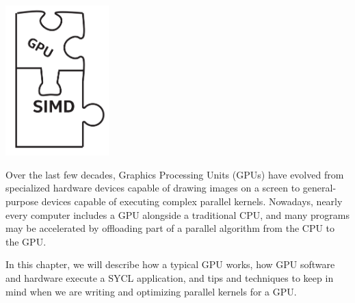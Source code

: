\begin{center}
	\includegraphics[width=0.3\textwidth]{content/chapter-15/images/1}
\end{center}

Over the last few decades, Graphics Processing Units (GPUs) have evolved from specialized hardware devices capable of drawing images on a screen to general-purpose devices capable of executing complex parallel kernels. Nowadays, nearly every computer includes a GPU alongside a traditional CPU, and many programs may be accelerated by offloading part of a parallel algorithm from the CPU to the GPU.\par

In this chapter, we will describe how a typical GPU works, how GPU software and hardware execute a SYCL application, and tips and techniques to keep in mind when we are writing and optimizing parallel kernels for a GPU.\par























































